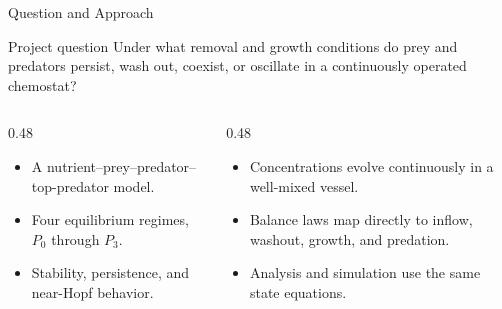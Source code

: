 \begin{frame}{Question and Approach}
  \begin{block}{Project question}
    Under what removal and growth conditions do prey and predators persist,
    wash out, coexist, or oscillate in a continuously operated chemostat?
  \end{block}

  \vspace{0.2cm}
  \begin{columns}[T,onlytextwidth]
    \begin{column}{0.48\textwidth}
      \begin{itemize}
        \item A nutrient--prey--predator--top-predator model.
        \item Four equilibrium regimes, $P_0$ through $P_3$.
        \item Stability, persistence, and near-Hopf behavior.
      \end{itemize}
    \end{column}
    \begin{column}{0.48\textwidth}
      \begin{itemize}
        \item Concentrations evolve continuously in a well-mixed vessel.
        \item Balance laws map directly to inflow, washout, growth, and predation.
        \item Analysis and simulation use the same state equations.
      \end{itemize}
    \end{column}
  \end{columns}
\end{frame}

